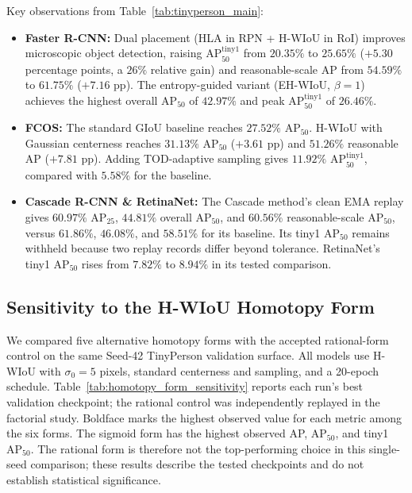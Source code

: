 \documentclass[11pt,a4paper]{article}
\begin{document}
Key observations from Table~\ref{tab:tinyperson_main}:
\begin{itemize}
  \item \textbf{Faster R-CNN:} Dual placement (HLA in RPN + H-WIoU in RoI) improves microscopic object detection, raising $\mathrm{AP}_{50}^{\mathrm{tiny1}}$ from $20.35\%$ to $25.65\%$ ($+5.30$ percentage points, a $26\%$ relative gain) and reasonable-scale AP from $54.59\%$ to $61.75\%$ ($+7.16$ pp). The entropy-guided variant (EH-WIoU, $\beta=1$) achieves the highest overall $\mathrm{AP}_{50}$ of $42.97\%$ and peak $\mathrm{AP}_{50}^{\mathrm{tiny1}}$ of $26.46\%$.
  \item \textbf{FCOS:} The standard GIoU baseline reaches $27.52\%$ $\mathrm{AP}_{50}$. H-WIoU with Gaussian centerness reaches $31.13\%$ $\mathrm{AP}_{50}$ ($+3.61$ pp) and $51.26\%$ reasonable AP ($+7.81$ pp). Adding TOD-adaptive sampling gives $11.92\%$ $\mathrm{AP}_{50}^{\mathrm{tiny1}}$, compared with $5.58\%$ for the baseline.
  \item \textbf{Cascade R-CNN \& RetinaNet:} The Cascade method's clean EMA replay gives $60.97\%$ AP$_{25}$, $44.81\%$ overall AP$_{50}$, and $60.56\%$ reasonable-scale AP$_{50}$, versus $61.86\%$, $46.08\%$, and $58.51\%$ for its baseline. Its tiny1 AP$_{50}$ remains withheld because two replay records differ beyond tolerance. RetinaNet's tiny1 AP$_{50}$ rises from $7.82\%$ to $8.94\%$ in its tested comparison.
\end{itemize}

\subsection{Sensitivity to the H-WIoU Homotopy Form}
\label{sec:homotopy_form_sensitivity}

We compared five alternative homotopy forms with the accepted rational-form control on the same Seed-42 TinyPerson validation surface. All models use H-WIoU with $\sigma_0=5$ pixels, standard centerness and sampling, and a 20-epoch schedule. Table~\ref{tab:homotopy_form_sensitivity} reports each run's best validation checkpoint; the rational control was independently replayed in the factorial study. Boldface marks the highest observed value for each metric among the six forms. The sigmoid form has the highest observed AP, AP$_{50}$, and tiny1 AP$_{50}$. The rational form is therefore not the top-performing choice in this single-seed comparison; these results describe the tested checkpoints and do not establish statistical significance.
\end{document}
